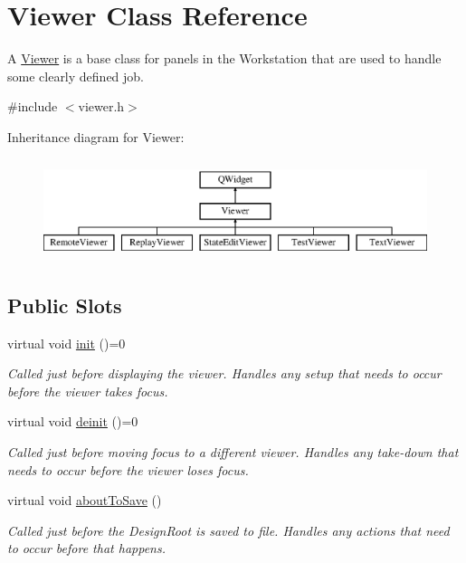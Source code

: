 \hypertarget{class_viewer}{\section{Viewer Class Reference}
\label{class_viewer}
}


A \hyperlink{class_viewer}{Viewer} is a base class for panels in the Workstation that are used to handle some clearly defined job.  




{\ttfamily \#include $<$viewer.\-h$>$}

Inheritance diagram for Viewer\-:\begin{figure}[H]
\begin{center}
\leavevmode
\includegraphics[height=3.000000cm]{class_viewer}
\end{center}
\end{figure}
\subsection*{Public Slots}
\begin{DoxyCompactItemize}
\item 
\hypertarget{class_viewer_a78e0e1af1e09f32032b95546a0c74d3e}{virtual void \hyperlink{class_viewer_a78e0e1af1e09f32032b95546a0c74d3e}{init} ()=0}\label{class_viewer_a78e0e1af1e09f32032b95546a0c74d3e}

\begin{DoxyCompactList}\small\item\em Called just before displaying the viewer. Handles any setup that needs to occur before the viewer takes focus. \end{DoxyCompactList}\item 
virtual void \hyperlink{class_viewer_ae36f82194449083e10825229a9e22fdf}{deinit} ()=0
\begin{DoxyCompactList}\small\item\em Called just before moving focus to a different viewer. Handles any take-\/down that needs to occur before the viewer loses focus. \end{DoxyCompactList}\item 
\hypertarget{class_viewer_ad2cf4211ec8bf80d953daab04b14038a}{virtual void \hyperlink{class_viewer_ad2cf4211ec8bf80d953daab04b14038a}{about\-To\-Save} ()}\label{class_viewer_ad2cf4211ec8bf80d953daab04b14038a}

\begin{DoxyCompactList}\small\item\em Called just before the Design\-Root is saved to file. Handles any actions that need to occur before that happens. \end{DoxyCompactList}\end{DoxyCompactItemize}
